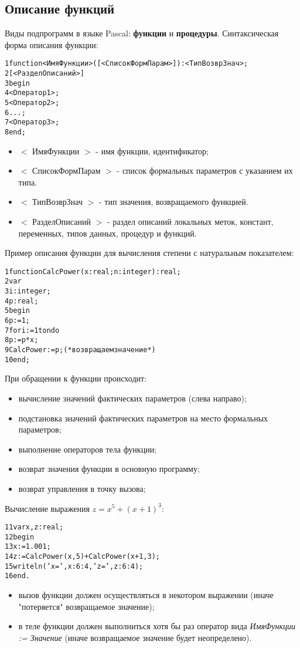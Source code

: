 \documentclass{beamer}
\begin{document}
\subsection{Описание функций}
\begin{frame}[fragile]
Виды подпрограмм в языке Pascal: \textbf{функции} и \textbf{процедуры}. Синтаксическая форма описания функции:
\begin{alltt}
1 function <ИмяФункции>([<СписокФормПарам>]):<ТипВозврЗнач>;
2     [<РазделОписаний>]
3 begin
4   <Оператор1>;
5   <Оператор2>;
6   ...;
7   <Оператор3>;
8 end;
\end{alltt}
\begin{itemize}
\item $<$ ИмяФункции $>$ - имя функции, идентификатор;
\item $<$ СписокФормПарам $>$ - список формальных параметров с указанием их типа.
\item $<$ ТипВозврЗнач $>$ - тип значения, возвращаемого функцией.
\item $<$ РазделОписаний $>$ - раздел описаний локальных меток, констант, переменных, типов данных, процедур и функций.
\end{itemize}
\end{frame}

\begin{frame}[fragile]
Пример описания функции для вычисления степени с натуральным показателем:
\begin{alltt}
1 function CalcPower(x: real; n: integer):real;
2 var 
3   i: integer;
4   p: real;
5 begin
6   p := 1;
7   for i := 1 to n do 
8       p := p * x;
9   CalcPower := p; (*возвращаем значение*)
10 end;
\end{alltt}
\end{frame}

\begin{frame}[fragile]
При обращении к функции происходит:
\begin{itemize}
\item вычисление значений фактических параметров (слева направо);
\item подстановка значений фактических параметров на место формальных параметров;
\item выполнение операторов тела функции;
\item возврат значения функции в основную программу;
\item возврат управления в точку вызова;
\end{itemize}
Вычисление выражения $z = x^{5} + (x+1)^{3}$:
\begin{alltt}
11 var x, z: real; 
12 begin
13   x := 1.001;
14   z := CalcPower(x, 5) + CalcPower(x+1, 3);
15   writeln('x=', x:6:4, 'z=', z:6:4);
16 end.
\end{alltt}
\begin{itemize}
\item вызов функции должен осуществляться в некотором выражении (иначе "потеряется" возвращаемое значение);
\item в теле функции должен выполниться хотя бы раз оператор вида \textit{ИмяФункции := Значение} (иначе возвращаемое значение будет неопределено).
\end{itemize}
\end{frame}
\end{document}
